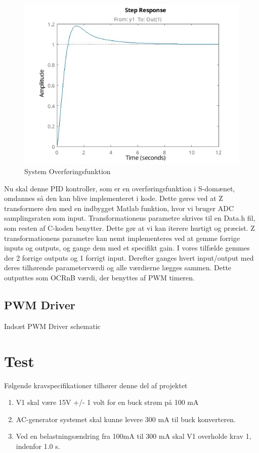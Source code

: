 \documentclass[../main.tex]{subfiles}
\begin{document}
\begin{figure}[H]
      \includegraphics[width=\textwidth]{Dokumentation/Figures/Motor PID Step Response.jpg}
     \caption{System Overføringsfunktion}
     \label{fig: System Overføringsfunktion}
     \end{figure}

Nu skal denne PID kontroller, som er en overføringsfunktion i S-domænet, omdannes så den kan blive implementeret i kode. Dette gøres ved at Z transformere den med en indbygget Matlab funktion, hvor vi bruger ADC samplingsraten som input. Transformationens parametre skrives til en Data.h fil, som resten af C-koden benytter. Dette gør at vi kan iterere hurtigt og præcist. Z transformationens parametre kan nemt implementeres ved at gemme forrige inputs og outputs, og gange dem med et specifikt gain. I vores tilfælde gemmes der 2 forrige outputs og 1 forrigt input. Derefter ganges hvert input/output med deres tilhørende parameterværdi og alle værdierne lægges sammen. Dette outputtes som OCRnB værdi, der benyttes af PWM timeren.

\subsection{PWM Driver}
Indsæt PWM Driver schematic

\section{Test}
Følgende kravspecifikationer tilhører denne del af projektet
\begin{enumerate}
  \item V1 skal være 15V +/- 1 volt for en buck strøm på 100 mA
  \item AC-generator systemet skal kunne levere 300 mA til buck konverteren.
  \item Ved en belastningsændring fra 100mA til 300 mA skal V1 overholde krav 1, indenfor 1.0 s.
\end{enumerate}
\end{document}
